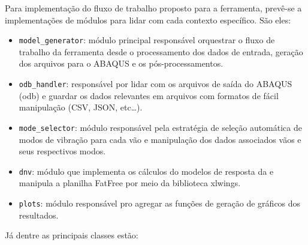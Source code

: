 Para implementação do fluxo de trabalho proposto para a ferramenta, prevê-se a implementações de módulos para lidar com cada contexto específico. São eles:

\begin{itemize}
    \item \texttt{model\_generator}: módulo principal responsável orquestrar o fluxo de trabalho da ferramenta desde o processamento dos dados de entrada, geração dos arquivos para o ABAQUS e os pós-processamentos.
    
    \item \texttt{odb\_handler}: responsável por lidar com os arquivos de saída do ABAQUS (odb) e guardar os dados relevantes em arquivos com formatos de fácil manipulação (CSV, JSON, etc\ldots).
    
    \item \texttt{mode\_selector}: módulo responsável pela estratégia de seleção automática de modos de vibração para cada vão e manipulação dos dados associados vãos e seus respectivos modos.
    
    \item \texttt{dnv}: módulo que implementa os cálculos do modelos de resposta da  e manipula a planilha FatFree por meio da biblioteca xlwings.
    
    \item \texttt{plots}: módulo responsável pro agregar as funções de geração de gráficos dos resultados.
\end{itemize}

Já dentre as principais classes estão:


